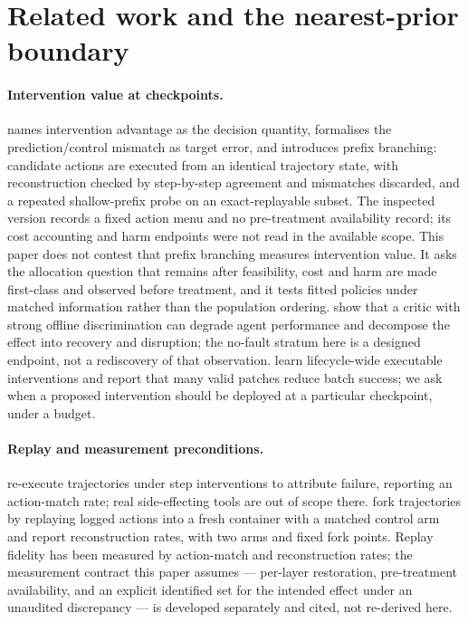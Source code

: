 \section{Related work and the nearest-prior boundary}
\label{sec:related}

\paragraph{Intervention value at checkpoints.}
\citet{calibrationnotcontrol2026} names intervention advantage as the decision
quantity, formalises the prediction/control mismatch as target error, and
introduces prefix branching: candidate actions are executed from an identical
trajectory state, with reconstruction checked by step-by-step agreement and
mismatches discarded, and a repeated shallow-prefix probe on an exact-replayable
subset.  The inspected version records a fixed action menu and no pre-treatment
availability record; its cost accounting and harm endpoints were not read in the
available scope.  This paper does not contest that prefix branching measures
intervention value.  It asks the allocation question that remains after
feasibility, cost and harm are made first-class and observed before treatment,
and it tests fitted policies under matched information rather than the
population ordering.  \citet{interventionparadox2026} show that a critic with
strong offline discrimination can degrade agent performance and decompose the
effect into recovery and disruption; the no-fault stratum here is a designed
endpoint, not a rediscovery of that observation.
\citet{harnessr12026} learn lifecycle-wide executable interventions and report
that many valid patches reduce batch success; we ask when a proposed
intervention should be deployed at a particular checkpoint, under a budget.

\paragraph{Replay and measurement preconditions.}
\citet{causalagentreplay2026} re-execute trajectories under step interventions
to attribute failure, reporting an action-match rate; real side-effecting tools
are out of scope there.  \citet{replaygap2026} fork trajectories by replaying
logged actions into a fresh container with a matched control arm and report
reconstruction rates, with two arms and fixed fork points.  Replay fidelity has
been measured by action-match and reconstruction rates; the measurement
contract this paper assumes --- per-layer restoration, pre-treatment
availability, and an explicit identified set for the intended effect under an
unaudited discrepancy --- is developed separately and cited, not re-derived
here.

